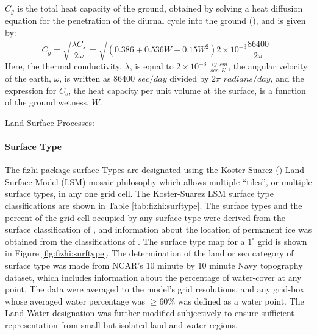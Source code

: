$C_g$ is the total heat capacity of the ground, obtained by solving a heat diffusion equation
for the penetration of the diurnal cycle into the ground (\cite{black:77}), and is given by:
\[
C_g = \sqrt{ \frac{\lambda C_s }{ 2\omega} } = \sqrt{(0.386 + 0.536W + 0.15W^2)2\times10^{-3}
\frac{86400}{2\pi} } \, \, .
\]
Here, the thermal conductivity, $\lambda$, is equal to $2\times10^{-3}$ $\frac{ly}{sec}
\frac{cm}{K}$,
the angular velocity of the earth, $\omega$, is written as $86400$ $sec/day$ divided
by $2 \pi$ $radians/  
day$, and the expression for $C_s$, the heat capacity per unit volume at the surface,
is a function of the ground wetness, $W$.

Land Surface Processes:

\paragraph{Surface Type}
The fizhi package surface Types are designated using the Koster-Suarez (\cite{ks:91,ks:92}) 
Land Surface Model (LSM) mosaic philosophy which allows multiple ``tiles'', or multiple surface 
types, in any one grid cell. The Koster-Suarez LSM surface type classifications
are shown in Table \ref{tab:fizhi:surftype}. The surface types and the percent of the grid
cell occupied by any surface type were derived from the surface classification of
\cite{deftow:94}, and information about the location of permanent
ice was obtained from the classifications of \cite{dorsell:89}.
The surface type map for a $1^\circ$ grid is shown in Figure \ref{fig:fizhi:surftype}.
The determination of the land or sea category of surface type was made from NCAR's
10 minute by 10 minute Navy topography 
dataset, which includes information about the percentage of water-cover at any point.
The data were averaged to the model's grid resolutions,
and any grid-box whose averaged water percentage was $\geq 60 \%$ was
defined as a water point. The Land-Water designation was further modified
subjectively to ensure sufficient representation from small but isolated land and water regions.
 
